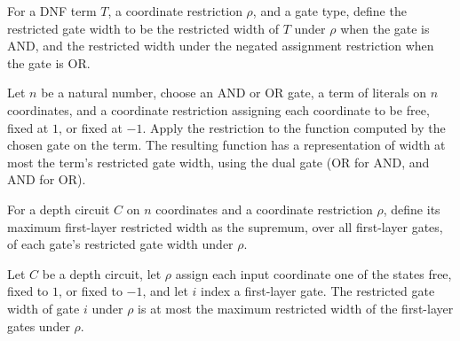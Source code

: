 \begin{definition}
\label{FABL.DNFTerm.restrictedGateWidth}
\leanok
{}
For a DNF term $T$, a coordinate restriction $\rho$, and a gate type, define the
restricted gate width to be the restricted width of $T$ under $\rho$ when the gate is
AND, and the restricted width under the negated assignment restriction when the gate is
OR.
\end{definition}

\begin{theorem}
\label{FABL.CircuitGate.hasWidthLE_restrictSign_evalTerm}
\leanok
{}
Let $n$ be a natural number, choose an AND or OR gate, a term of literals on $n$
coordinates, and a coordinate restriction assigning each coordinate to be free, fixed at
$1$, or fixed at $-1$. Apply the restriction to the function computed by the chosen gate
on the term. The resulting function has a representation of width at most the term's
restricted gate width, using the dual gate (OR for AND, and AND for OR).
\end{theorem}

\begin{definition}
\label{FABL.DepthCircuit.maxLayer1RestrictedWidth}
\leanok
{}
For a depth circuit $C$ on $n$ coordinates and a coordinate restriction $\rho$, define
its maximum first-layer restricted width as the supremum, over all first-layer gates, of
each gate's restricted gate width under $\rho$.
\end{definition}

\begin{theorem}
\label{FABL.DepthCircuit.layer1RestrictedWidth_le_max}
\leanok
{}
Let $C$ be a depth circuit, let $\rho$ assign each input coordinate one of the states
free, fixed to $1$, or fixed to $-1$, and let $i$ index a first-layer gate. The
restricted gate width of gate $i$ under $\rho$ is at most the maximum restricted width
of the first-layer gates under $\rho$.
\end{theorem}


